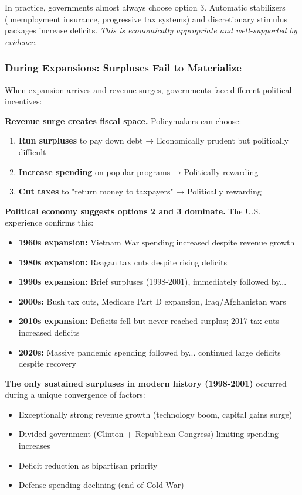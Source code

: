 \documentclass[12pt,letterpaper]{article}
\begin{document}
In practice, governments almost always choose option 3. Automatic stabilizers (unemployment insurance, progressive tax systems) and discretionary stimulus packages increase deficits. \textit{This is economically appropriate and well-supported by evidence.}

\subsubsection{During Expansions: Surpluses Fail to Materialize}

When expansion arrives and revenue surges, governments face different political incentives:

\textbf{Revenue surge creates fiscal space.} Policymakers can choose:
\begin{enumerate}
    \item \textbf{Run surpluses} to pay down debt → Economically prudent but politically difficult
    \item \textbf{Increase spending} on popular programs → Politically rewarding
    \item \textbf{Cut taxes} to "return money to taxpayers" → Politically rewarding
\end{enumerate}

\textbf{Political economy suggests options 2 and 3 dominate.} The U.S. experience confirms this:

\begin{itemize}
    \item \textbf{1960s expansion:} Vietnam War spending increased despite revenue growth
    \item \textbf{1980s expansion:} Reagan tax cuts despite rising deficits
    \item \textbf{1990s expansion:} Brief surpluses (1998-2001), immediately followed by...
    \item \textbf{2000s:} Bush tax cuts, Medicare Part D expansion, Iraq/Afghanistan wars
    \item \textbf{2010s expansion:} Deficits fell but never reached surplus; 2017 tax cuts increased deficits
    \item \textbf{2020s:} Massive pandemic spending followed by... continued large deficits despite recovery
\end{itemize}

\textbf{The only sustained surpluses in modern history (1998-2001)} occurred during a unique convergence of factors:
\begin{itemize}
    \item Exceptionally strong revenue growth (technology boom, capital gains surge)
    \item Divided government (Clinton + Republican Congress) limiting spending increases
    \item Deficit reduction as bipartisan priority
    \item Defense spending declining (end of Cold War)
\end{itemize}
\end{document}
